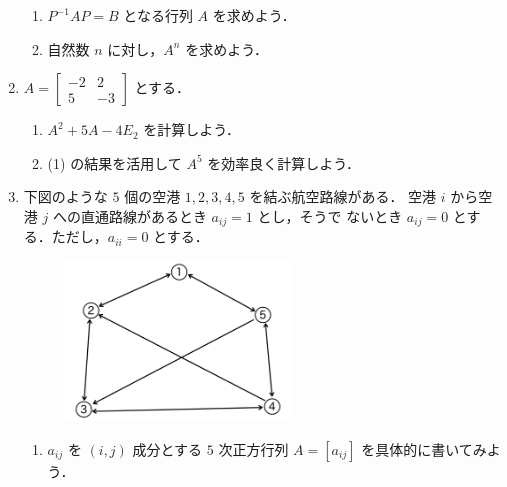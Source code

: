 \documentclass[11pt, uplatex, dvipdfmx]{jsarticle}
\begin{document}
\begin{enumerate}[label=\ref{sec:matrix}.\arabic*]
  \vspace{1zh}
  
  \begin{enumerate}[label=(\arabic*)]
    \setlength{\itemsep}{1ex}
    
  \item $P^{-1}AP=B$ となる行列 $A$ を求めよう．

  \item 自然数 $n$ に対し，$A^n$ を求めよう．
  \end{enumerate}

\item $A=\left[
    \begin{array}{rr}
      -2 & 2\\
      5 & -3
    \end{array}
  \right]$ とする．

  \vspace{1zh}

  \begin{enumerate}[label=(\arabic*)]
    \setlength{\itemsep}{1ex}
    
  \item $A^2+5A-4E_2$ を計算しよう．

  \item (1) の結果を活用して $A^5$ を効率良く計算しよう．
  \end{enumerate}
  
\item 下図のような $5$ 個の空港 $1, 2, 3, 4 ,5$ を結ぶ航空路線がある．
  空港 $i$ から空港 $j$ への直通路線があるとき $a_{ij}=1$ とし，そうで
  ないとき $a_{ij}=0$ とする．ただし，$a_{ii}=0$ とする．
  \begin{figure}[h]
    \centering
    \includegraphics[width=6cm]{./pictures/routes.pdf}
  \end{figure}

  \begin{enumerate}[label=(\arabic*)]
    \setlength{\itemsep}{1ex}
    
  \item $a_{ij}$ を $(i,j)$ 成分とする $5$ 次正方行列 $A=\left[ a_{ij}\right]$ を具体的に書いてみよう．


\end{enumerate}
\end{enumerate}
\end{document}
